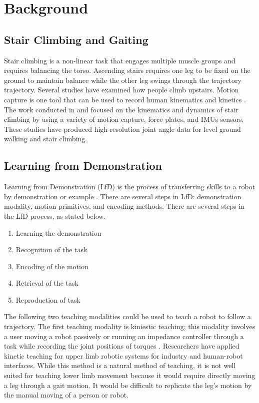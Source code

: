 \section{Background} 

\subsection{Stair Climbing and Gaiting}  

Stair climbing is a non-linear task that engages multiple muscle groups and requires balancing the torso. Ascending stairs requires one leg to be fixed on the ground to maintain balance while the other leg swings through the trajectory trajectory\cite{hicks2012temporal}. Several studies have examined how people climb upstairs. Motion capture is one tool that can be used to record human kinematics and kinetics  \cite{chalodhorn2007learning} \cite{hu2014online} \cite{huang2018learning}. The work conducted in \cite{andriacchi1980study} and \cite{hicks2011lower} focused on the kinematics and dynamics of stair climbing by using a variety of motion capture, force plates, and IMUs sensors. These studies have produced high-resolution joint angle data for level ground walking and stair climbing.

\subsection{Learning from Demonstration}  

Learning from Demonstration (LfD) is the process of transferring skills to a robot by demonstration or example \cite{siciliano2016springer}\cite{Calinon2018} \cite{kormushev2011imitation} \cite{calinon2007teacher}. There are several steps in LfD: demonstration modality, motion primitives, and encoding methods. There are several steps in the LfD process, as stated below. 

\begin{enumerate} 
    \item Learning the demonstration 
    \item Recognition of the task 
    \item Encoding of the motion 
    \item Retrieval of the task 
    \item Reproduction of task 
\end{enumerate} 

The following two teaching modalities could be used to teach a  robot to follow a trajectory. The first teaching modality is kiniestic teaching; this modality involves a user moving a robot passively or running an impedance controller through a task while recording the joint positions of torques \cite{Calinon2018}. Researchers have applied kinetic teaching for upper limb robotic systems for industry and human-robot interfaces. While this method is a natural method of teaching, it is not well suited for teaching lower limb movement because it would require directly moving a leg through a gait motion. It would be difficult to replicate the leg's motion by the manual moving of a person or robot. 

